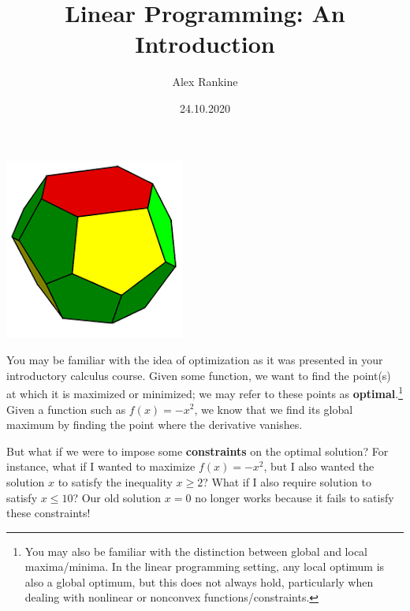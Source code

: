 \documentclass{paper}
\begin{document}
\large 
\linespread{1.5} 

\title{Linear Programming: An Introduction}
\author{Alex Rankine}
\date{24.10.2020}



\maketitle
\vspace{1in}

\begin{center} 
    \includegraphics[]{polyhedron.png} 
\end{center} 
\newpage 

\tableofcontents

\newpage

You may be familiar with the idea of optimization as it was presented in your introductory calculus course. Given some function, we want to find the point(s) at which it is  maximized or minimized; we may refer to these points as \textbf{optimal}.\footnote{You may also be familiar with the distinction between global and local maxima/minima. In the linear programming setting, any local optimum is also a global optimum, but this does not always hold, particularly when dealing with nonlinear or nonconvex functions/constraints.} Given a function such as $f(x) = -x^2$, we know that we find its global maximum by finding the point where the derivative vanishes. 

\medskip But what if we were to impose some \textbf{constraints} on the optimal solution? For instance, what if I wanted to maximize $f(x) = -x^2$, but I also wanted the solution $x$ to satisfy the inequality $x \geq 2$? What if I also require solution to satisfy $x \leq 10$? Our old solution $x = 0$ no longer works because it fails to satisfy these constraints! 
\end{document}

